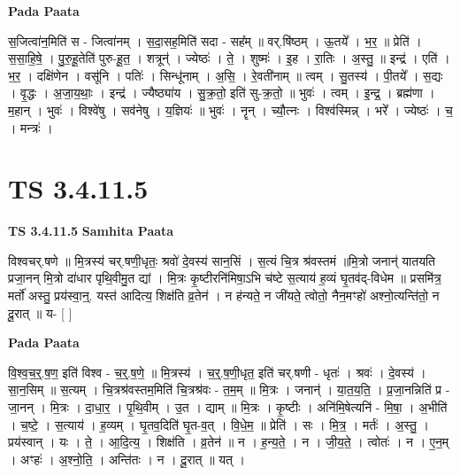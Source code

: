 \documentclass[17pt]{extarticle}
\begin{document}
\textbf{Pada Paata} \newline

स॒जित्वा॑न॒मिति॑ स - जित्वा॑नम् । स॒दा॒सह॒मिति॑ सदा - सह᳚म् ॥ वर्.षि॑ष्ठम् । ऊ॒तये᳚ । भ॒र॒ ॥ प्रेति॑ । स॒सा॒हि॒षे॒ । पु॒रु॒हू॒तेति॑ पुरु-हू॒त॒ । शत्रून्॑ । ज्येष्ठः॑ । ते॒ । शुष्मः॑ । इ॒ह । रा॒तिः । अ॒स्तु॒ ॥ इन्द्र॑ । एति॑ । भ॒र॒ । दक्षि॑णेन । वसू॑नि । पतिः॑ । सिन्धू॑नाम् । अ॒सि॒ । रे॒वती॑नाम् ॥ त्वम् । सु॒तस्य॑ । पी॒तये᳚ । स॒द्यः । वृ॒द्धः । अ॒जा॒य॒थाः॒ । इन्द्र॑ । ज्यैष्ठ्या॑य । सु॒क्र॒तो॒ इति॑ सु-क्र॒तो॒ ॥ भुवः॑ । त्वम् । इ॒न्द्र॒ । ब्रह्म॑णा । म॒हान् । भुवः॑ । विश्वे॑षु । सव॑नेषु । य॒ज्ञियः॑ ॥ भुवः॑ । नॄन् । च्यौ॒त्नः । विश्व॑स्मिन्न् । भरे᳚ । ज्येष्ठः॑ । च॒ । मन्त्रः॑ ।  \newline





\section{ TS 3.4.11.5 }

\textbf{TS 3.4.11.5 } \newline
\textbf{Samhita Paata} \newline

विश्वचर्.षणे ॥ मि॒त्रस्य॑ चर्.षणी॒धृतः॒ श्रवो॑ दे॒वस्य॑ सान॒सिं । स॒त्यं चि॒त्र श्र॑वस्तमं ॥मि॒त्रो जनान्॑ यातयति प्रजा॒नन् मि॒त्रो दा॑धार पृथि॒वीमु॒त द्यां । मि॒त्रः कृ॒ष्टीरनि॑मिषा॒ऽभि च॑ष्टे स॒त्याय॑ ह॒व्यं घृ॒तव॑द्-विधेम ॥ प्रसमि॑त्र॒ मर्तो॑ अस्तु॒ प्रय॑स्वा॒न्॒. यस्त॑ आदित्य॒ शिक्ष॑ति व्र॒तेन॑ । न ह॑न्यते॒ न जी॑यते॒ त्वोतो॒ नैन॒मꣳहो॑ अश्नो॒त्यन्ति॑तो॒ न दू॒रात् ॥ य- [  ] \newline

\textbf{Pada Paata} \newline

वि॒श्व॒च॒र्॒.ष॒ण॒ इति॑ विश्व - च॒र्॒.ष॒णे॒ ॥ मि॒त्रस्य॑ । च॒र्॒.ष॒णी॒धृत॒ इति॑ चर्.षणी - धृतः॑ । श्रवः॑ । दे॒वस्य॑ । सा॒न॒सिम् ॥ स॒त्यम् । चि॒त्रश्र॑वस्तम॒मिति॑ चि॒त्रश्र॑वः - त॒म॒म् ॥ मि॒त्रः । जनान्॑ । या॒त॒य॒ति॒ । प्र॒जा॒नन्निति॑ प्र - जा॒नन् । मि॒त्रः । दा॒धा॒र॒ । पृ॒थि॒वीम् । उ॒त । द्याम् ॥ मि॒त्रः । कृ॒ष्टीः । अनि॑मि॒षेत्यनि॑ - मि॒षा॒ । अ॒भीति॑ । च॒ष्टे॒ । स॒त्याय॑ । ह॒व्यम् । घृ॒तव॒दिति॑ घृ॒त-व॒त् । वि॒धे॒म॒ ॥ प्रेति॑ । सः । मि॒त्र॒ । मर्तः॑ । अ॒स्तु॒ । प्रय॑स्वान् । यः । ते॒ । आ॒दि॒त्य॒ । शिक्ष॑ति । व्र॒तेन॑ ॥ न । ह॒न्य॒ते॒ । न । जी॒य॒ते॒ । त्वोतः॑ । न । ए॒न॒म् । अꣳहः॑ । अ॒श्नो॒ति॒ । अन्ति॑तः । न । दू॒रात् ॥ यत् ।  \newline
\end{document}
